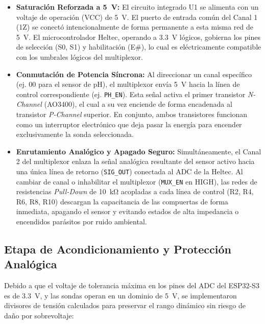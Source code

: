 \begin{itemize}
  \item \textbf{Saturación Reforzada a \SI{5}{\volt}:} El circuito integrado U1 se alimenta con un voltaje de operación (VCC) de \SI{+5}{\volt}. El puerto de entrada común del Canal 1 (1Z) se conectó intencionalmente de forma permanente a esta misma red de \SI{+5}{\volt}. El microcontrolador Heltec, operando a \SI{3.3}{\volt} lógicos, gobierna los pines de selección (S0, S1) y habilitación (E\#), lo cual es eléctricamente compatible con los umbrales lógicos del multiplexor.
  \item \textbf{Conmutación de Potencia Síncrona:} Al direccionar un canal específico (ej. 00 para el sensor de pH), el multiplexor envía \SI{+5}{\volt} hacia la línea de control correspondiente (ej. \texttt{PH\_EN}). Esta señal activa el primer transistor \textit{N-Channel} (AO3400), el cual a su vez enciende de forma encadenada al transistor \textit{P-Channel} superior. En conjunto, ambos transistores funcionan como un interruptor electrónico que deja pasar la energía para encender exclusivamente la sonda seleccionada.
  \item \textbf{Enrutamiento Analógico y Apagado Seguro:} Simultáneamente, el Canal 2 del multiplexor enlaza la señal analógica resultante del sensor activo hacia una única línea de retorno (\texttt{SIG\_OUT}) conectada al ADC de la Heltec. Al cambiar de canal o inhabilitar el multiplexor (\texttt{MUX\_EN} en HIGH), las redes de resistencias \textit{Pull-Down} de \SI{10}{\kilo\ohm} acopladas a cada línea de control (R2, R4, R6, R8, R10) descargan la capacitancia de las compuertas de forma inmediata, apagando el sensor y evitando estados de alta impedancia o encendidos parásitos por ruido ambiental.
\end{itemize}

\subsection{Etapa de Acondicionamiento y Protección Analógica}
\label{subsec:etapa_acondicionamiento_proteccion}

Debido a que el voltaje de tolerancia máxima en los pines del ADC del ESP32-S3 es de \SI{3.3}{\volt}, y las sondas operan en un dominio de \SI{5}{\volt}, se implementaron divisores de tensión calculados para preservar el rango dinámico sin riesgo de daño por sobrevoltaje:

